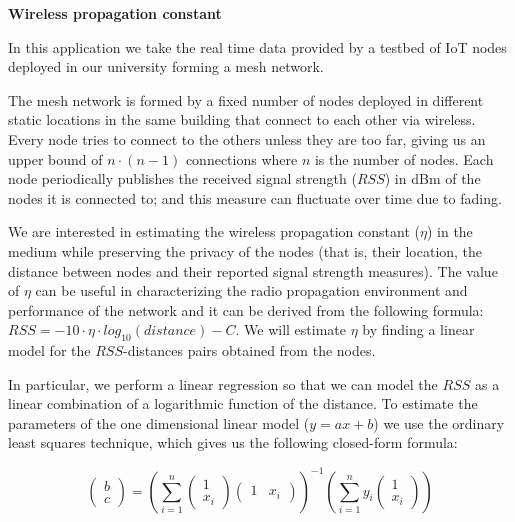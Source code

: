 \bigskip
\noindent\textbf{Wireless propagation constant}

In this application we take the real time data provided by a testbed of IoT
nodes deployed in our university forming a mesh network.

The mesh network is formed by a fixed number of nodes deployed in different
static locations in the same building that connect to each other via wireless.
Every node tries to connect to the others unless they are too far, giving us an
upper bound of $n \cdot (n-1)$ connections where $n$ is the number of nodes.
Each node periodically publishes the received signal strength ($RSS$) in dBm of
the nodes it is connected to; and this measure can fluctuate over time due to
fading.

We are interested in estimating the wireless propagation constant ($\eta$) in
the medium while preserving the privacy of the nodes (that is, their location,
the distance between nodes and their reported signal strength measures).
The value of $\eta$ can be useful in characterizing the radio propagation
environment and performance of the network and it can be derived from the
following formula: \mbox{$RSS = -10 \cdot \eta \cdot log_{10}(distance) - C$}.
We will estimate $\eta$ by finding a linear model for the $RSS$-distances pairs
obtained from the nodes.

In particular, we perform a linear regression so that we can model the $RSS$ as
a linear combination of a logarithmic function of the distance.  To estimate
the parameters of the one dimensional linear model ($y = ax + b$) we use the
ordinary least squares technique, which gives us the following closed-form
formula:

\[
\begin{pmatrix} b \\ c \end{pmatrix} =
\left( \displaystyle\sum_{i=1}^n \begin{pmatrix} 1 \\ x_i \end{pmatrix}
  \begin{pmatrix} 1 & x_i\end{pmatrix}\right)^{-1}
\left( \displaystyle\sum_{i=1}^n y_i \begin{pmatrix} 1 \\ x_i \end{pmatrix}\right)
\]
\bigskip

